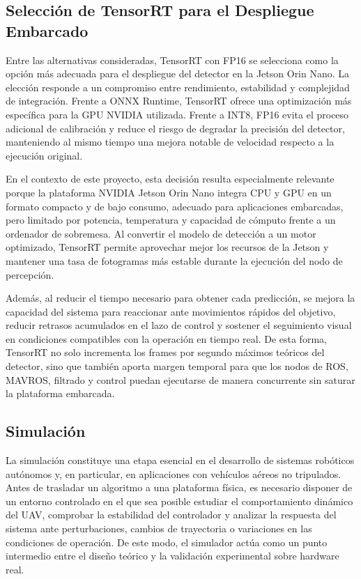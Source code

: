 \vspace{0.3cm}

\subsection{Selección de TensorRT para el Despliegue Embarcado}

Entre las alternativas consideradas, TensorRT con FP16 se selecciona como la opción más adecuada para el despliegue del detector en la Jetson Orin Nano. La elección responde a un compromiso entre rendimiento, estabilidad y complejidad de integración. Frente a ONNX Runtime, TensorRT ofrece una optimización más específica para la GPU NVIDIA utilizada. Frente a INT8, FP16 evita el proceso adicional de calibración y reduce el riesgo de degradar la precisión del detector, manteniendo al mismo tiempo una mejora notable de velocidad respecto a la ejecución original.

\vspace{0.3cm}

En el contexto de este proyecto, esta decisión resulta especialmente relevante porque la plataforma NVIDIA Jetson Orin Nano integra CPU y GPU en un formato compacto y de bajo consumo, adecuado para aplicaciones embarcadas, pero limitado por potencia, temperatura y capacidad de cómputo frente a un ordenador de sobremesa. Al convertir el modelo de detección a un motor optimizado, TensorRT permite aprovechar mejor los recursos de la Jetson y mantener una tasa de fotogramas más estable durante la ejecución del nodo de percepción.

\vspace{0.3cm}

Además, al reducir el tiempo necesario para obtener cada predicción, se mejora la capacidad del sistema para reaccionar ante movimientos rápidos del objetivo, reducir retrasos acumulados en el lazo de control y sostener el seguimiento visual en condiciones compatibles con la operación en tiempo real. De esta forma, TensorRT no solo incrementa los frames por segundo máximos teóricos del detector, sino que también aporta margen temporal para que los nodos de ROS, MAVROS, filtrado y control puedan ejecutarse de manera concurrente sin saturar la plataforma embarcada.


\subsection{Simulación}

La simulación constituye una etapa esencial en el desarrollo de sistemas robóticos autónomos y, en particular, en aplicaciones con vehículos aéreos no tripulados. Antes de trasladar un algoritmo a una plataforma física, es necesario disponer de un entorno controlado en el que sea posible estudiar el comportamiento dinámico del UAV, comprobar la estabilidad del controlador y analizar la respuesta del sistema ante perturbaciones, cambios de trayectoria o variaciones en las condiciones de operación. De este modo, el simulador actúa como un punto intermedio entre el diseño teórico y la validación experimental sobre hardware real.

